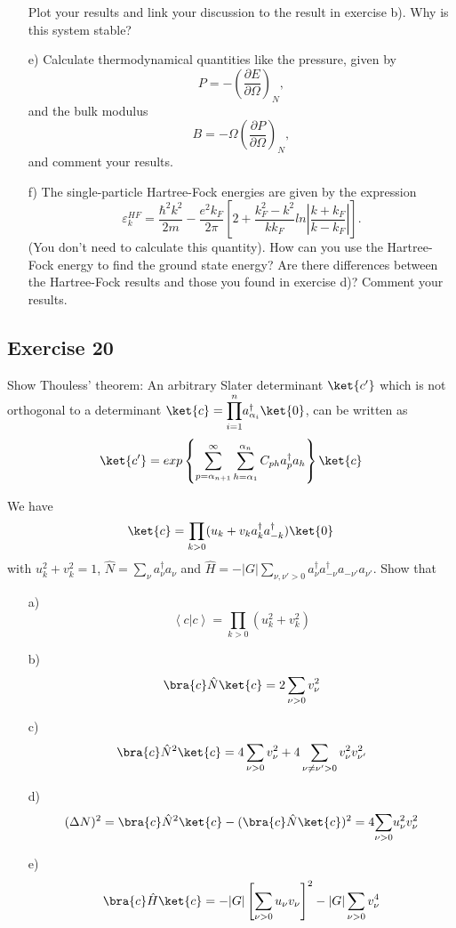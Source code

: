 \begin{prob}
\begin{enumerate}
Plot your results and link your discussion to the result in exercise b). Why is this system stable?
\item[e)] 
Calculate thermodynamical quantities like the pressure, given by
\[
P=-\left(\frac{\partial E}{\partial \Omega}\right)_N,\]
and the bulk modulus
\[
B=-\Omega\left(\frac{\partial P}{\partial \Omega}\right)_N,\]
and comment your results.
\item[f)] 
The single-particle Hartree-Fock energies are given by the expression 
\[
\varepsilon_{k}^{HF}=\frac{\hbar^{2}k^{2}}{2m}-\frac{e^{2}
k_{F}}{2\pi}
\left[
2+\frac{k_{F}^{2}-k^{2}}{kk_{F}}ln\left\vert\frac{k+k_{F}}
{k-k_{F}}\right\vert
\right].
\]
(You don't need to calculate this quantity).  How can you use the Hartree-Fock energy to 
find the ground state energy? Are there differences between the Hartree-Fock results and those you 
found in exercise d)?  Comment your results.
\end{enumerate}
\end{prob}
\begin{prob}
\subsection*{Exercise 20}
Show Thouless' theorem: An arbitrary Slater determinant $\ket{c'}$ which is not orthogonal to a determinant
$\ket{c}={\displaystyle\prod_{i=1}^{n}}
a_{\alpha_{i}}^{\dagger}\ket{0}$, can be written as
\[
\ket{c'}=exp\left\{\sum_{p=\alpha_{n+1}}^{\infty}
\sum_{h=\alpha_{1}}^{\alpha_{n}}C_{ph}a_{p}^{\dagger}
a_{h}\right\}\ket{c}
\]
\end{prob}
\begin{prob}
We have
\[
\ket{c}=\prod_{k>0}(u_{k}+v_{k}a_{k}^{\dagger}a_{-
k}^{\dagger})\ket{0}
\]
with $u_{k}^{2}+v_{k}^{2}=1$,
$\hat{N}={\displaystyle \sum_{\nu}}a_{\nu}^{\dagger}a_{\nu}$ and
$\hat{H}=-|G|{\displaystyle
\sum_{\nu,\nu'>0}}a_{\nu}^{\dagger}a_{-
\nu}^{\dagger}a_{-\nu'}a_{\nu'}$.
Show that
\begin{enumerate}
\item[a)]
\[
\left \langle c|c\right \rangle=\prod_{k>0}(u_{k}^{2}+v_{k}^{2})
\]
\item[b)]
\[
\bra{c}\hat{N}\ket{c}=2\sum_{\nu >0}v_{\nu}^{2}
\]
\item[c)]
\[
\bra{c}\hat{N}^{2}\ket{c}=4\sum_{\nu>0}
v_{\nu}^{2}+4\sum_{\nu\neq\nu '>0}v_{\nu}^{2}v_{\nu '}^{2}
\]
\item[d)]
\[
(\Delta
N)^{2}=\bra{c}\hat{N}^{2}\ket{c}-(\bra{c}\hat{N}\ket{c})^{2}
	   =4{\displaystyle \sum_{\nu >0}}u_{\nu}^{2}v_{\nu}^{2}
\]
\item[e)]
\[
\bra{c}\hat{H}\ket{c}=-|G|\left[\sum_{\nu
>0}u_{\nu}v_{\nu}\right]^{2}
		-|G|\sum_{\nu >0}v_{\nu}^{4}
\]
\end{enumerate}
\end{prob}
